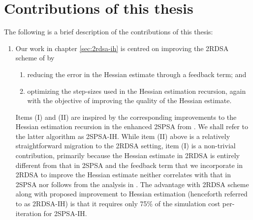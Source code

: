 \section{Contributions of this thesis}
The following is a brief description of the contributions of this thesis:
\begin{enumerate}
\item Our work in chapter \ref{sec:2rdsa-ih} is centred on improving the 2RDSA scheme of \cite{prashanth2015rdsa} by 
\begin{enumerate}[label={\bf\Roman*}]
\item reducing the error in the Hessian estimate through a feedback term; and
\item optimizing the step-sizes used in the Hessian estimation recursion, again with the objective of improving the quality of the Hessian estimate.
\end{enumerate}

Items (I) and (II) are inspired by the corresponding improvements to the Hessian estimation recursion in the enhanced 2SPSA from \cite{spall-jacobian}. We shall refer to the latter algorithm as 2SPSA-IH. While item (II) above is a relatively straightforward migration to the 2RDSA setting, item (I) is a non-trivial contribution, primarily because the Hessian estimate in 2RDSA is entirely different from that in 2SPSA and the feedback term that we incorporate in 2RDSA to improve the Hessian estimate neither correlates with that in 2SPSA nor follows from the analysis in \cite{spall-jacobian}. 
The advantage with 2RDSA scheme along with proposed improvement to Hessian estimation (henceforth referred to as 2RDSA-IH) is that it requires only 75\% of the simulation cost per-iteration for 2SPSA-IH.


\end{enumerate}

